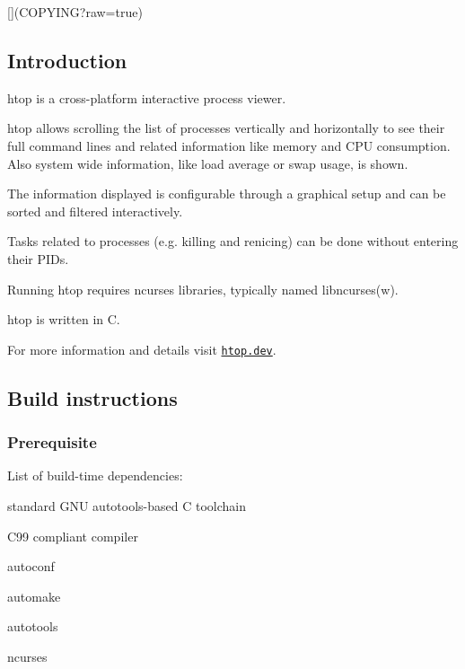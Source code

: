 \href{https://github.com/htop-dev/htop/actions}{\tt } \href{https://scan.coverity.com/projects/21665}{\tt } \href{https://groups.io/g/htop}{\tt } \href{https://web.libera.chat/#htop}{\tt } \href{https://github.com/htop-dev/htop/releases/latest}{\tt } \href{https://repology.org/project/htop/versions}{\tt } \mbox{[}\mbox{]}(C\+O\+P\+Y\+I\+NG?raw=true)



\subsection*{Introduction}

{\ttfamily htop} is a cross-\/platform interactive process viewer.

{\ttfamily htop} allows scrolling the list of processes vertically and horizontally to see their full command lines and related information like memory and C\+PU consumption. Also system wide information, like load average or swap usage, is shown.

The information displayed is configurable through a graphical setup and can be sorted and filtered interactively.

Tasks related to processes (e.\+g. killing and renicing) can be done without entering their P\+I\+Ds.

Running {\ttfamily htop} requires {\ttfamily ncurses} libraries, typically named libncurses(w).

{\ttfamily htop} is written in C.

For more information and details visit \href{https://htop.dev}{\tt htop.\+dev}.

\subsection*{Build instructions}

\subsubsection*{Prerequisite}

List of build-\/time dependencies\+:
\begin{DoxyItemize}
\item standard G\+NU autotools-\/based C toolchain
\begin{DoxyItemize}
\item C99 compliant compiler
\item {\ttfamily autoconf}
\item {\ttfamily automake}
\item {\ttfamily autotools}
\end{DoxyItemize}
\item {\ttfamily ncurses}
\end{DoxyItemize}

